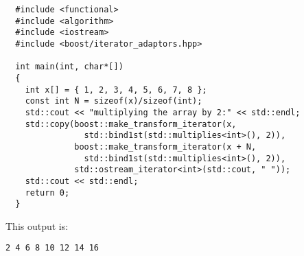 \documentclass{netobjectdays}
\begin{document}
{\footnotesize
\begin{verbatim}
  #include <functional>
  #include <algorithm>
  #include <iostream>
  #include <boost/iterator_adaptors.hpp>

  int main(int, char*[])
  {
    int x[] = { 1, 2, 3, 4, 5, 6, 7, 8 };
    const int N = sizeof(x)/sizeof(int);
    std::cout << "multiplying the array by 2:" << std::endl;
    std::copy(boost::make_transform_iterator(x, 
                std::bind1st(std::multiplies<int>(), 2)),
              boost::make_transform_iterator(x + N, 
                std::bind1st(std::multiplies<int>(), 2)),
              std::ostream_iterator<int>(std::cout, " "));
    std::cout << std::endl;
    return 0;
  }
\end{verbatim}
}

\noindent This output is: 
{\footnotesize
\begin{verbatim}
2 4 6 8 10 12 14 16
\end{verbatim}
}



\end{document}
